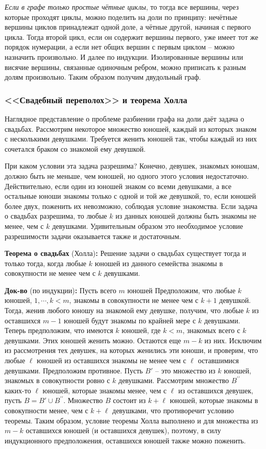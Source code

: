 \documentclass[12pt, a4paper]{article}
\begin{document}
\textit{Если в графе только простые чётные циклы}, то тогда все вершины, через которые проходят циклы, можно поделить на доли по принципу: нечётные вершины циклов принадлежат одной доле, а чётные другой, начиная с первого цикла. Тогда второй цикл, если он содержит вершины первого, уже имеет тот же порядок нумерации, а если нет общих вершин с первым циклом -- можно назначить произвольно. И далее по индукции. Изолированные вершины или висячие вершины, связанные одиночным ребром, можно приписать к разным долям произвольно. Таким образом получим двудольный граф.

\subsubsection{<<Свадебный переполох>> и теорема Холла}

Наглядное представление о проблеме разбиении графа на доли даёт задача о свадьбах. Рассмотрим некоторое множество юношей, каждый из которых знаком с несколькими девушками. Требуется женить юношей так, чтобы каждый из них сочетался браком со знакомой ему девушкой.

При каком условии эта задача разрешима? Конечно, девушек, знакомых юношам, должно быть не меньше, чем юношей, но одного этого условия недостаточно. Действительно, если один из юношей знаком со всеми девушками, а все остальные юноши знакомы только с одной и той же девушкой, то, если юношей более двух, поженить их невозможно, соблюдая условие знакомства. Если задача о свадьбах разрешима, то любые $k$ из данных юношей должны быть знакомы не менее, чем с $k$ девушками. Удивительным образом это необходимое условие разрешимости задачи оказывается также и достаточным.

\textbf{Теорема о свадьбах} (Холла)\textbf{:} Решение задачи о свадьбах существует тогда и только тогда, когда любые $k$ юношей из данного семейства знакомы в совокупности не менее чем с $k$ девушками.

\textbf{Док-во} (по индукции)\textbf{:} Пусть всего $m$ юношей Предположим, что любые $k$ юношей, $1, \cdots, k < m$, знакомы в совокупности не менее чем с $k+1$ девушкой. Тогда, женив любого юношу на знакомой ему девушке, получим, что любые $k$ из оставшихся $m-1$ юношей будут знакомы по крайней мере с $k$ девушками. Теперь предположим, что имеются $k$ юношей, где $k < m$, знакомых всего с $k$ девушками. Этих юношей женить можно. Остаются еще $m - k$ из них. Исключим из рассмотрения тех девушек, на которых женились эти юноши, и проверим, что любые $\ell$ юношей из оставшихся знакомы не менее чем с $\ell$ оставшимися девушками. Предположим противное. Пусть $B'$ -- это множество из $k$ юношей, знакомых в совокупности ровно с $k$ девушками. Рассмотрим множество $B^{\prime \prime}$ каких-то $\ell$ юношей, которые знакомы менее, чем с $\ell$ из оставшихся девушек, пусть $B = B' \cup B^{\prime \prime}$. Множество $B$ состоит из $k + \ell$ юношей, которые знакомы в совокупности менее, чем с $k + \ell$ девушками, что противоречит условию теоремы. Таким образом, условие теоремы Холла выполнено и для множества из $m - k$ оставшихся юношей (и оставшихся девушек), поэтому, в силу индукционного предположения, оставшихся юношей также можно поженить.
\end{document}
